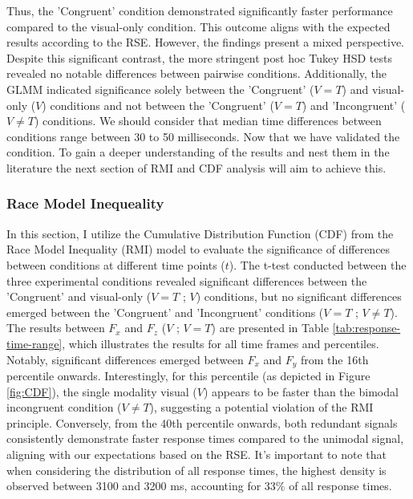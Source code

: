 \documentclass[12pt,oneside,openright]{report}
\begin{document}
Thus, the 'Congruent' condition demonstrated significantly faster performance compared to the visual-only condition. This outcome aligns with the expected results according to the RSE. However, the findings present a mixed perspective. Despite this significant contrast, the more stringent post hoc Tukey HSD tests revealed no notable differences between pairwise conditions. Additionally, the GLMM indicated significance solely between the 'Congruent' ($V=T$) and visual-only ($V$) conditions and not between the 'Congruent' ($V=T$) and 'Incongruent' ($V \neq T$) conditions. We should consider that median time differences between conditions range between 30 to 50 milliseconds. Now that we have validated the condition. To gain a deeper understanding of the results and nest them in the literature the next section of RMI and CDF analysis will aim to achieve this. 

\subsubsection*{Race Model Inequeality}

In this section, I utilize the Cumulative Distribution Function (CDF) from the Race Model Inequality (RMI) model to evaluate the significance of differences between conditions at different time points ($t$). The t-test conducted between the three experimental conditions revealed significant differences between the 'Congruent' and visual-only ($V=T$ ; $V$) conditions, but no significant differences emerged between the 'Congruent' and 'Incongruent' conditions ($V=T$ ; $V \neq T$). The results between $F_x$ and $F_z$ ($V$ ; $V=T$) are presented in Table \ref{tab:response-time-range}, which illustrates the results for all time frames and percentiles. Notably, significant differences emerged between $F_x$ and $F_y$ from the 16th percentile onwards. Interestingly, for this percentile (as depicted in Figure \ref{fig:CDF}), the single modality visual ($V$) appears to be faster than the bimodal incongruent condition ($V \neq T$), suggesting a potential violation of the RMI principle. Conversely, from the 40th percentile onwards, both redundant signals consistently demonstrate faster response times compared to the unimodal signal, aligning with our expectations based on the RSE. It's important to note that when considering the distribution of all response times, the highest density is observed between 3100 and 3200 ms, accounting for 33\% of all response times.
\end{document}
